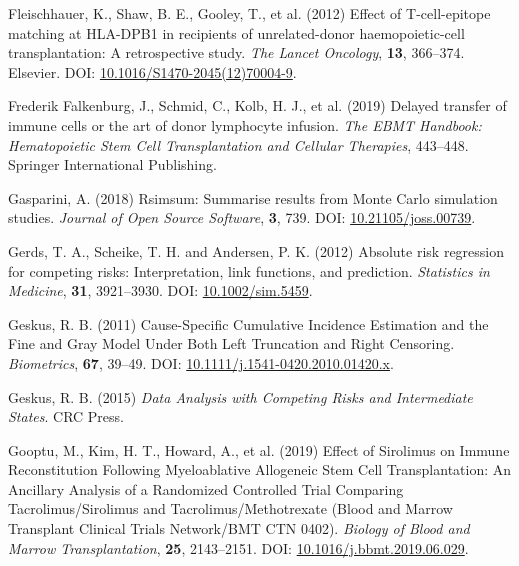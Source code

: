 \documentclass[
  letterpaper,
  DIV=11,
  numbers=noendperiod]{scrreprt}
\newlength{\cslhangindent}
\newenvironment{CSLReferences}[2] %
 {\begin{list}{}{%
  \setlength{\itemindent}{0pt}
  \setlength{\leftmargin}{0pt}
  \setlength{\parsep}{0pt}
  \ifodd #1
   \setlength{\leftmargin}{\cslhangindent}
   \setlength{\itemindent}{-1\cslhangindent}
  \fi
  \setlength{\itemsep}{#2\baselineskip}}}
 {\end{list}}
\begin{document}
\begin{CSLReferences}{1}{1}
Fleischhauer, K., Shaw, B. E., Gooley, T., et al. (2012) Effect of
{T-cell-epitope} matching at {HLA-DPB1} in recipients of unrelated-donor
haemopoietic-cell transplantation: A retrospective study. \emph{The
Lancet Oncology}, \textbf{13}, 366--374. Elsevier. DOI:
\href{https://doi.org/10.1016/S1470-2045(12)70004-9}{10.1016/S1470-2045(12)70004-9}.

Frederik Falkenburg, J., Schmid, C., Kolb, H. J., et al. (2019) Delayed
transfer of immune cells or the art of donor lymphocyte infusion.
\emph{The EBMT Handbook: Hematopoietic Stem Cell Transplantation and
Cellular Therapies}, 443--448. Springer International Publishing.

Gasparini, A. (2018) Rsimsum: {Summarise} results from {Monte Carlo}
simulation studies. \emph{Journal of Open Source Software}, \textbf{3},
739. DOI:
\href{https://doi.org/10.21105/joss.00739}{10.21105/joss.00739}.

Gerds, T. A., Scheike, T. H. and Andersen, P. K. (2012) Absolute risk
regression for competing risks: Interpretation, link functions, and
prediction. \emph{Statistics in Medicine}, \textbf{31}, 3921--3930. DOI:
\href{https://doi.org/10.1002/sim.5459}{10.1002/sim.5459}.

Geskus, R. B. (2011) Cause-{Specific Cumulative Incidence Estimation}
and the {Fine} and {Gray Model Under Both Left Truncation} and {Right
Censoring}. \emph{Biometrics}, \textbf{67}, 39--49. DOI:
\href{https://doi.org/10.1111/j.1541-0420.2010.01420.x}{10.1111/j.1541-0420.2010.01420.x}.

Geskus, R. B. (2015) \emph{Data Analysis with Competing Risks and
Intermediate States}. CRC Press.

Gooptu, M., Kim, H. T., Howard, A., et al. (2019) Effect of {Sirolimus}
on {Immune Reconstitution Following Myeloablative Allogeneic Stem Cell
Transplantation}: {An Ancillary Analysis} of a {Randomized Controlled
Trial Comparing Tacrolimus}/{Sirolimus} and {Tacrolimus}/{Methotrexate}
({Blood} and {Marrow Transplant Clinical Trials Network}/{BMT CTN}
0402). \emph{Biology of Blood and Marrow Transplantation}, \textbf{25},
2143--2151. DOI:
\href{https://doi.org/10.1016/j.bbmt.2019.06.029}{10.1016/j.bbmt.2019.06.029}.


\end{CSLReferences}
\end{document}
